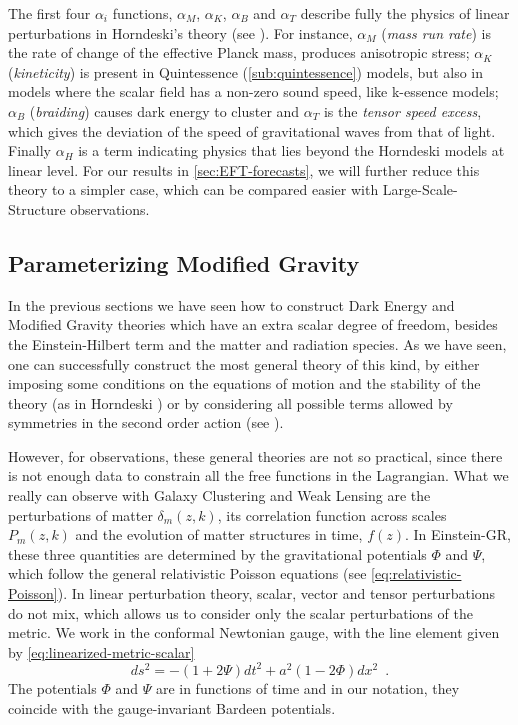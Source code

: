 The first four $\alpha_i$ functions, $\alpha_M$, $\alpha_K$,
$\alpha_B$ and $\alpha_T$  describe fully the physics
of linear perturbations in Horndeski's theory (see \cite{bellini, sawicki}).
For instance, $\alpha_M$ (\emph{mass run rate}) is the rate of change of the effective Planck mass, 
produces anisotropic stress; $\alpha_K$ (\emph{kineticity}) is present in Quintessence (\cref{sub:quintessence}) models, 
but also in models where the scalar field has a non-zero sound speed, like k-essence models;
$\alpha_B$ (\emph{braiding}) causes dark energy to cluster and $\alpha_T$ is the \emph{tensor speed excess}, which gives the deviation
of the speed of gravitational waves from that of light.
Finally $\alpha_H$ is a term indicating physics that lies beyond the Horndeski models at linear level. 
For our results in \cref{sec:EFT-forecasts}, we will further reduce this theory to a simpler case, 
which can be compared easier with Large-Scale-Structure observations.


\subsection{Parameterizing Modified Gravity \label{sub:parameterizing-MG}}

In the previous sections we have seen how to construct Dark Energy and Modified Gravity theories 
which have an extra scalar degree of freedom, besides the Einstein-Hilbert term and the matter and radiation species.
As we have seen, one can successfully construct the most general theory of this kind, by either imposing
some conditions on the equations of motion and the stability of the theory (as in Horndeski \cite{horndeski}) or by considering all
possible terms allowed by symmetries in the second order action (see \cite{creminelli, gubitosi, gleyzes}).

However, for observations, these general theories are not so practical, since there is not enough data to constrain
all the free functions in the Lagrangian. What we really can observe with Galaxy Clustering and Weak Lensing 
are the perturbations of matter $\delta_m(z,k)$, its correlation function across scales $P_m(z,k)$ and the
evolution of matter structures in time, $f(z)$.
In Einstein-GR, these three quantities are determined by the gravitational potentials $\Phi$ and $\Psi$, which follow 
the general relativistic Poisson equations (see \cref{eq:relativistic-Poisson}). 
In linear perturbation theory, scalar, vector and tensor perturbations
do not mix, which allows us to consider only the scalar perturbations of the metric. 
We work in the conformal Newtonian gauge, with the
line element given by \cref{eq:linearized-metric-scalar}
\begin{equation}
ds^{2}=-(1+2\Psi)dt^{2}+a^{2}(1-2\Phi)dx^{2}\,\,\,.
\end{equation}
The potentials $\Phi$ and $\Psi$ are in functions of time and in our notation, they coincide
with the gauge-invariant Bardeen potentials.

